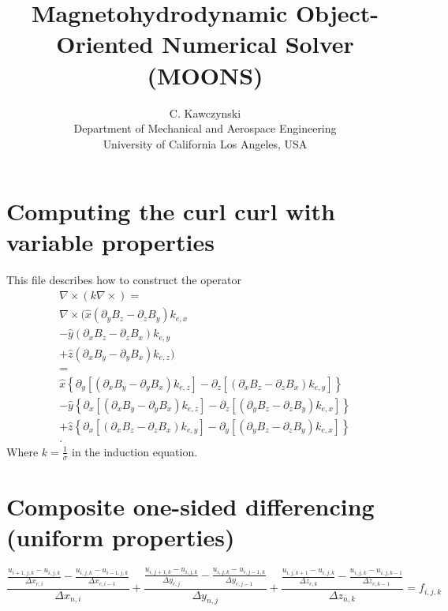 \documentclass[11pt]{article}
\begin{document}
\doublespacing
\title{Magnetohydrodynamic Object-Oriented Numerical Solver (MOONS)}
\author{C. Kawczynski \\
Department of Mechanical and Aerospace Engineering \\
University of California Los Angeles, USA\\
}
\maketitle

\section{Computing the curl curl with variable properties}
This file describes how to construct the operator
\begin{multline}
	\nabla \times (k \nabla \times) = \\
	\nabla \times (
	\hat{x} (\partial_y B_z - \partial_z B_y) k_{e,x} \\
	- \hat{y} (\partial_x B_z - \partial_z B_x) k_{e,y} \\
	+ \hat{z} (\partial_x B_y - \partial_y B_x) k_{e,z} ) \\
	= \\
	 \hat{x} \left\{ \partial_y \left[ (\partial_x B_y - \partial_y B_x) k_{e,z} \right] -
	  \partial_z \left[ (\partial_x B_z - \partial_z B_x) k_{e,y} \right] \right\} \\
	-\hat{y} \left\{ \partial_x \left[ (\partial_x B_y - \partial_y B_x) k_{e,z} \right] -
	 \partial_z \left[ (\partial_y B_z - \partial_z B_y) k_{e,x} \right]  \right\} \\
	+\hat{z} \left\{ \partial_x \left[ (\partial_x B_z - \partial_z B_x) k_{e,y} \right] -
	 \partial_y \left[ (\partial_y B_z - \partial_z B_y) k_{e,x} \right]  \right\} \\
	.
\end{multline}
Where $k = \frac{1}{\sigma}$ in the induction equation.



\section{Composite one-sided differencing (uniform properties)}

\begin{equation}
	\frac{\frac{u_{i+1,j,k}-u_{i,j,k}}{\Delta x_{c,i}} - \frac{u_{i,j,k}-u_{i-1,j,k}}{\Delta x_{c,i-1}}}{\Delta x_{n,i}} + 
	\frac{\frac{u_{i,j+1,k}-u_{i,j,k}}{\Delta y_{c,j}} - \frac{u_{i,j,k}-u_{i,j-1,k}}{\Delta y_{c,j-1}}}{\Delta y_{n,j}} +
	\frac{\frac{u_{i,j,k+1}-u_{i,j,k}}{\Delta z_{c,k}} - \frac{u_{i,j,k}-u_{i,j,k-1}}{\Delta z_{c,k-1}}}{\Delta z_{n,k}} = f_{i,j,k}
\end{equation}
\end{document}
